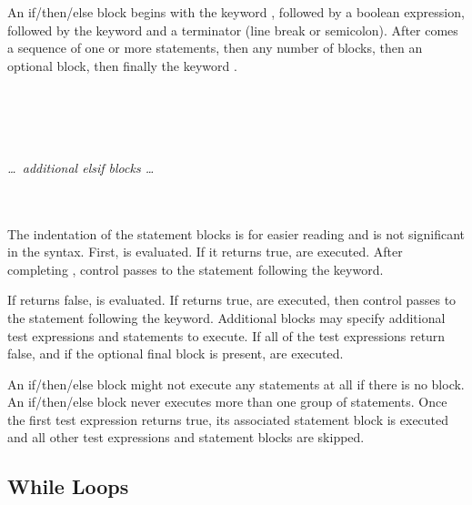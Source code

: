 An if/then/else block begins with the keyword , followed by a
boolean expression, followed by the keyword  and a
terminator (line break or semicolon).  After  comes a
sequence of one or more statements, then any number of 
blocks, then an optional  block, then finally the keyword
.

\begin{syntax}
   \\
\codeindent{} \\
   \\
\codeindent{} \\
\textit{\dots\ additional elsif blocks \dots} \\
 \\
\codeindent{} \\
\end{syntax}

The indentation of the statement blocks is for easier reading and is
not significant in the syntax.  First,  is evaluated.  If it
returns true,  are executed.  After completing
, control passes to the statement following the
 keyword.  

If  returns false,  is evaluated.  If  returns
true,  are executed, then control passes to the
statement following the  keyword.  Additional 
blocks may specify additional test expressions and statements to
execute.  If all of the test expressions return false, and if the
optional final  block is present,  are
executed.

An if/then/else block might not execute any statements at all if there
is no  block.  An if/then/else block never executes more
than one group of statements. Once the first test expression returns
true, its associated statement block is executed and all other test
expressions and statement blocks are skipped.



\subsection{While Loops}

\begin{syntax}
 \expr{}  \\
\codeindent\statements{} \\
\end{syntax}

